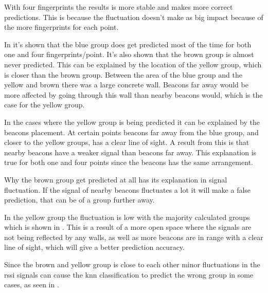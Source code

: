 \bigskip

With four fingerprints the results is more stable and makes more correct predictions.
This is because the fluctuation doesn't make as big impact because of the more fingerprints for each point.


In  it's shown that the blue group does get predicted most of the time for both one and four fingerprints/point.
It's also shown that the brown group is almost never predicted.
This can be explained by the location of the yellow group, which is closer than the brown group.
Between the area of the blue group and the yellow and brown there was a large concrete wall.
Beacons far away would be more affected by going through this wall than nearby beacons would, which is the case for the yellow group.

\bigskip

In the cases where the yellow group is being predicted it can be explained by the beacons placement.
At certain points beacons far away from the blue group, and closer to the yellow groups, has a clear line of sight.
A result from this is that nearby beacons have a weaker signal than beacons far away.
This explanation is true for both one and four points since the beacons has the same arrangement.

\bigskip

Why the brown group get predicted at all has its explanation in signal fluctuation.
If the signal of nearby beacons fluctuates a lot it will make a false prediction, that can be of a group further away.


In the yellow group the fluctuation is low with the majority calculated groups which is shown in .
This is a result of a more open space where the signals are not being reflected by any walls, as well as more beacons are in range with a clear line of sight, which will give a better prediction accuracy.

\bigskip

Since the brown and yellow group is close to each other minor fluctuations in the \acrshort{rssi} signals can cause the \acrshort{knn} classification to predict the wrong group in some cases, as seen in .


